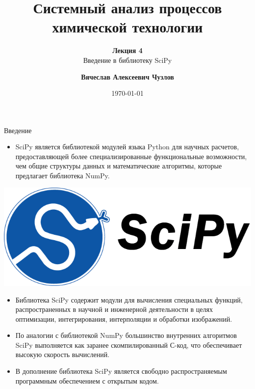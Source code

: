 \documentclass[aspectratio=169, mathserif]{beamer}	%
\title{\LARGE{Системный анализ процессов химической технологии}}
\subtitle{\textbf{Лекция 4} \\ Введение в библиотеку SciPy}
\author[]{\textbf{Вячеслав Алексеевич Чузлов}}
\institute{к.т.н., доцент ОХИ ИШПР}
\date{\today}
\begin{document}

\titleframe		%

\tocframe{}		%


\begin{frame}[fragile]{Введение}
\scriptsize
\begin{minipage}{.73\linewidth}
\begin{itemize}
	\item SciPy является библиотекой модулей языка Python для научных расчетов, предоставляющей более специализированные функциональные возможности, чем общие структуры данных и математические алгоритмы, которые предлагает библиотека NumPy. 
\end{itemize}
\end{minipage}
\begin{minipage}{.25\linewidth}
	\includegraphics[width=\linewidth]{./pics/scipy_logo}
\end{minipage}
\begin{itemize}
	\item Библиотека SciPy содержит модули для вычисления специальных функций, распространенных в  научной и инженерной деятельности в целях оптимизации, интегрирования, интерполяции и обработки изображений.
	\item 	По аналогии с библиотекой NumPy большинство внутренних алгоритмов SciPy выполняется как заранее скомпилированный С-код, что обеспечивает высокую скорость вычислений.
	\item В дополнение библиотека SciPy является свободно распространяемым программным обеспечением с открытым кодом.
\end{itemize}
\vfil
\end{frame}
\end{document}
